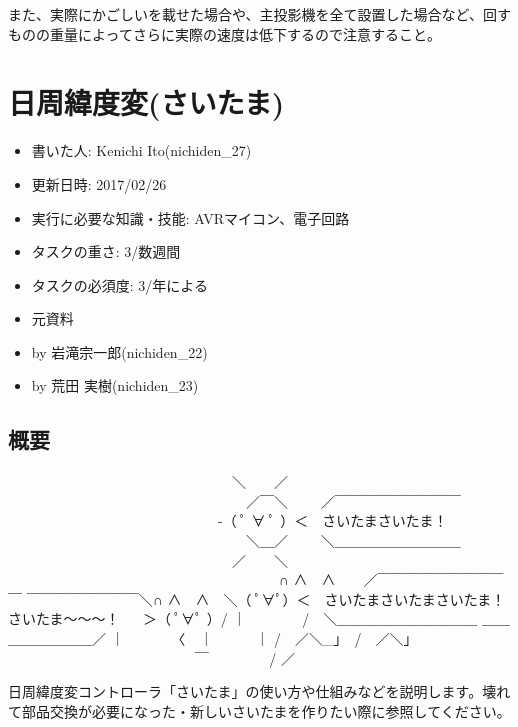 \documentclass[letterpaper,10pt,dvipdfmx]{sphinxmanual}
\begin{document}
また、実際にかごしいを載せた場合や、主投影機を全て設置した場合など、回すものの重量によってさらに実際の速度は低下するので注意すること。


\chapter{日周緯度変(さいたま)}
\label{\detokenize{nissyu-idohen/saitama::doc}}\label{\detokenize{nissyu-idohen/saitama:id1}}\begin{itemize}
\item {} 
書いた人: Kenichi Ito(nichiden\_27)

\item {} 
更新日時: 2017/02/26

\item {} 
実行に必要な知識・技能: AVRマイコン、電子回路

\item {} 
タスクの重さ: 3/数週間

\item {} 
タスクの必須度: 3/年による

\item {} 
元資料

\item {} 
 by 岩滝宗一郎(nichiden\_22)

\item {} 
 by 荒田 実樹(nichiden\_23)

\end{itemize}


\section{概要}
\label{\detokenize{nissyu-idohen/saitama:id2}}
　　　　　　　　　　　　　　　　＼　\textbar{}　／
　　　　　　　　　　　　　　　　　／￣＼　　 ／￣￣￣￣￣￣￣￣￣
　　　　　　　　　　　　　　　-（ ﾟ ∀ ﾟ ）＜　さいたまさいたま！
　　　　　　　　　　　　　　　　　＼＿／　　 ＼＿＿＿＿＿＿＿＿＿
　　　　　　　　　　　　　　　　／　\textbar{}　＼
　　　　　　　　　　　　　　　　　　　 ∩ ∧　∧　　／￣￣￣￣￣￣￣￣￣￣
￣￣￣￣￣￣￣￣＼∩ ∧　∧　＼（ ﾟ∀ﾟ）＜　さいたまさいたまさいたま！
さいたま～～～！ 　 ＞（ ﾟ∀ﾟ ）/ ｜　　　　/　＼＿＿＿＿＿＿＿＿＿＿
＿＿＿＿＿＿＿＿／ ｜　　　 〈　｜　　　｜
/　／＼\_」　/　／＼」 　　　　　　　　　　　　　 ￣　　　　 / ／

日周緯度変コントローラ「さいたま」の使い方や仕組みなどを説明します。壊れて部品交換が必要になった・新しいさいたまを作りたい際に参照してください。
\end{document}
